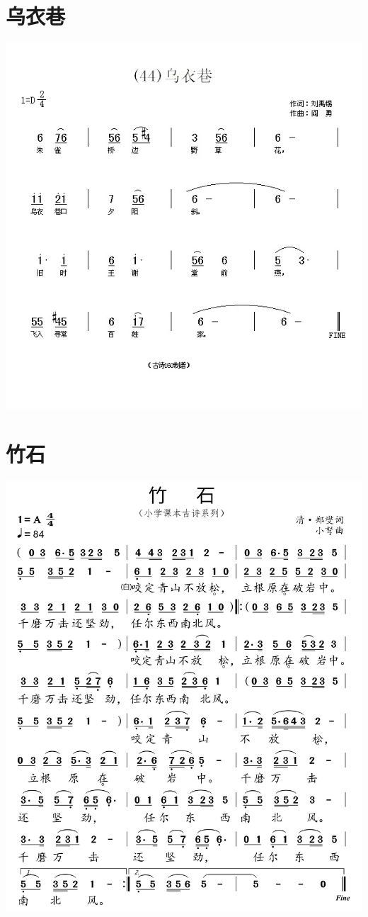 \documentclass[cn,pad,twocol]{elegantbook}
\begin{document}
\section{乌衣巷}    \includegraphics[width=\textwidth]{dongxiao/20200808-乌衣巷-刘禹锡.jpg}
\section{竹石}      \includegraphics[width=\textwidth]{dongxiao/20200808-竹石-郑燮.jpg}
\end{document}
